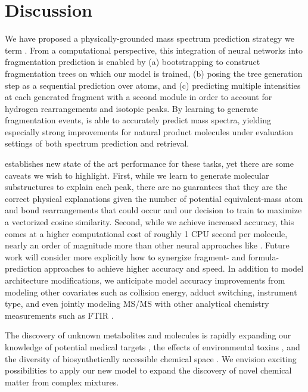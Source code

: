 \documentclass[journal=jcim,manuscript=article]{achemso}
\begin{document}
\section{Discussion}



We have proposed a physically-grounded mass spectrum prediction strategy we term \ourModel.  From a computational perspective, this integration of neural networks into fragmentation prediction is enabled by  (a) bootstrapping \MAGMA to construct fragmentation trees on which our model is trained, (b) posing the tree generation step as a sequential prediction over atoms, and (c) predicting multiple intensities at each generated fragment with a second module in order to account for  hydrogen rearrangements and isotopic peaks. 
By learning to generate fragmentation events, \ourModel is able to accurately predict mass spectra, yielding especially strong improvements for natural product molecules under evaluation settings of both spectrum prediction and retrieval. 

\ourModel  establishes new state of the art performance for these tasks, yet there are some caveats we wish to highlight. First, while we learn to generate molecular substructures to explain each peak, there are no guarantees that they are  the correct physical explanations given the number of potential equivalent-mass atom and bond rearrangements that could occur and our decision to train \ourModel \ourModelTwoShort to maximize a vectorized cosine similarity. Second, while we achieve increased accuracy, this comes at a higher computational cost of roughly 1 CPU second per molecule, nearly an order of magnitude more than other neural approaches like \scarfModel \cite{goldman_prefix-tree_2023}. 
Future work will consider more explicitly how to synergize fragment- and formula- prediction approaches to achieve higher accuracy and speed. In addition to model architecture modifications, we anticipate model accuracy improvements from modeling other covariates such as collision energy, adduct switching, instrument type, and even jointly modeling MS/MS with other analytical chemistry measurements such as FTIR \cite{fine2020spectral}. 

The discovery of unknown metabolites and molecules is rapidly expanding our knowledge of potential medical targets \cite{quinn_global_2020}, the effects of environmental toxins \cite{tian_2021_ubiquitous}, and the diversity of biosynthetically accessible chemical space \cite{doroghazi2014roadmap}. We envision exciting possibilities to apply our new model to expand the discovery of novel chemical matter from complex mixtures.
\end{document}
